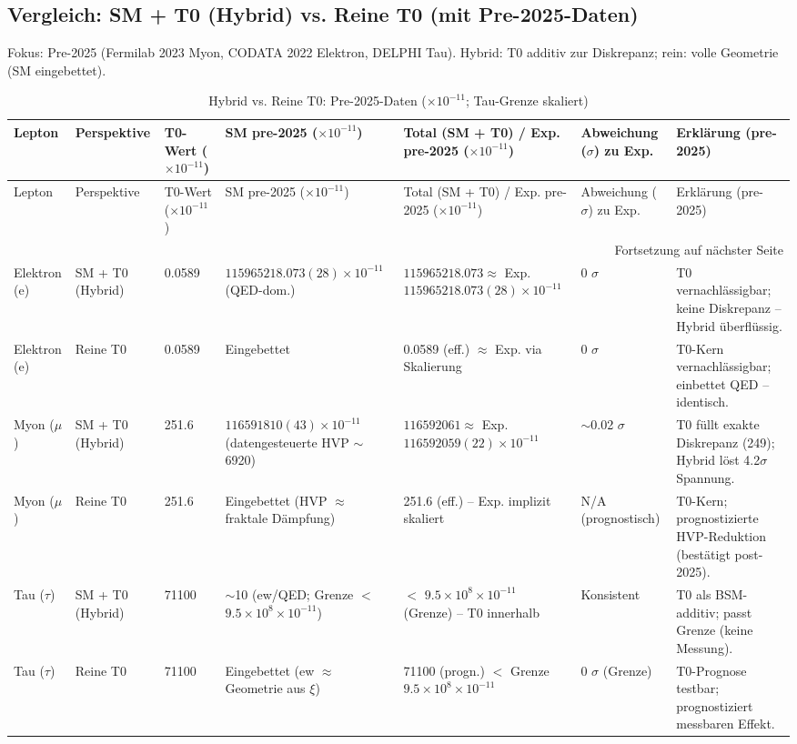 \documentclass[12pt,a4paper]{article}
\begin{document}
	\subsection{Vergleich: SM + T0 (Hybrid) vs. Reine T0 (mit Pre-2025-Daten)}
	
	Fokus: Pre-2025 (Fermilab 2023 Myon, CODATA 2022 Elektron, DELPHI Tau). Hybrid: T0 additiv zur Diskrepanz; rein: volle Geometrie (SM eingebettet).
	
	\begin{longtable}{p{1.3cm}p{2cm}p{1cm}p{3.5cm}p{3cm}p{1.8cm}p{2.8cm}}
		\caption{Hybrid vs. Reine T0: Pre-2025-Daten ($ \times 10^{-11}$; Tau-Grenze skaliert)} \label{tab:hybrid_pure}\\
		\toprule
		Lepton & Perspektive & T0-Wert ($ \times 10^{-11}$) & SM pre-2025 ($ \times 10^{-11}$) & Total (SM + T0) / Exp. pre-2025 ($ \times 10^{-11}$) & Abweichung ($\sigma$) zu Exp. & Erklärung (pre-2025) \\
		\midrule
		\endfirsthead
		
		\toprule
		Lepton & Perspektive & T0-Wert ($ \times 10^{-11}$) & SM pre-2025 ($ \times 10^{-11}$) & Total (SM + T0) / Exp. pre-2025 ($ \times 10^{-11}$) & Abweichung ($\sigma$) zu Exp. & Erklärung (pre-2025) \\
		\midrule
		\endhead
		
		\bottomrule
		\multicolumn{7}{r}{Fortsetzung auf nächster Seite} \\
		\endfoot
		
		Elektron (e) & SM + T0 (Hybrid) & 0.0589 & $115965218.073(28) \times 10^{-11}$ (QED-dom.) & $115965218.073 \approx$ Exp. $115965218.073(28) \times 10^{-11}$ & 0 $\sigma$ & T0 vernachlässigbar; keine Diskrepanz -- Hybrid überflüssig. \\
		Elektron (e) & Reine T0 & 0.0589 & Eingebettet & 0.0589 (eff.) $\approx$ Exp. via Skalierung & 0 $\sigma$ & T0-Kern vernachlässigbar; einbettet QED -- identisch. \\
		Myon ($\mu$) & SM + T0 (Hybrid) & 251.6 & $116591810(43) \times 10^{-11}$ (datengesteuerte HVP $\sim$6920) & $116592061 \approx$ Exp. $116592059(22) \times 10^{-11}$ & $\sim$0.02 $\sigma$ & T0 füllt exakte Diskrepanz (249); Hybrid löst 4.2$\sigma$ Spannung. \\
		Myon ($\mu$) & Reine T0 & 251.6 & Eingebettet (HVP $\approx$ fraktale Dämpfung) & 251.6 (eff.) -- Exp. implizit skaliert & N/A (prognostisch) & T0-Kern; prognostizierte HVP-Reduktion (bestätigt post-2025). \\
		Tau ($\tau$) & SM + T0 (Hybrid) & 71100 & $\sim$10 (ew/QED; Grenze $<$ $9.5\times10^{8} \times 10^{-11}$) & $<$ $9.5\times10^{8} \times 10^{-11}$ (Grenze) -- T0 innerhalb & Konsistent & T0 als BSM-additiv; passt Grenze (keine Messung). \\
		Tau ($\tau$) & Reine T0 & 71100 & Eingebettet (ew $\approx$ Geometrie aus $\xi$) & 71100 (progn.) $<$ Grenze $9.5\times10^{8} \times 10^{-11}$ & 0 $\sigma$ (Grenze) & T0-Prognose testbar; prognostiziert messbaren Effekt. \\
	\end{longtable}
	
\end{document}
